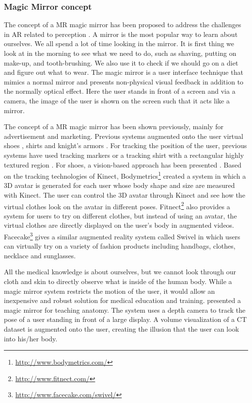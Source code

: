 \subsubsection{Magic Mirror concept}
The concept of a MR magic mirror has been proposed to address the challenges in AR related to perception \cite{Grosjean1999}.
A mirror is the most popular way to learn about ourselves. We all spend a lot of time looking in the mirror. It is first thing we look at in the morning to see what we need to do, such as shaving, putting on make-up, and tooth-brushing. We also use it to check if we should go on a diet and figure out what to wear. 
The magic mirror is a user interface technique that mimics a normal mirror and presents non-physical visual feedback in addition to the normally optical effect. Here the user stands in front of a screen and via a camera, the image of the user is shown on the screen such that it acts like a mirror.

The concept of a MR magic mirror has been shown previously, mainly for advertisement and marketing. 
Previous systems augmented onto the user virtual shoes \cite{Eisert2008,Luh2013}, shirts \cite{Ehara2006} and knight's armors \cite{Fiala2007}. For tracking the position of the user, previous systems have used tracking markers or a tracking shirt with a rectangular highly textured region \cite{Hilsmann2008}. For shoes, a vision-based approach has been presented \cite{Eisert2008}.
Based on the tracking technologies of Kinect, Bodymetrics\footnote{\url{http://www.bodymetrics.com/}} created a system in which a 3D avatar is generated for each user whose body shape and size are measured with Kinect. The user can control the 3D avatar through Kinect and see how the virtual clothes look on the avatar in different poses. Fitnect\footnote{\url{http://www.fitnect.com/}} also provides a system for users to try on different clothes, but instead of using an avatar, the virtual clothes are directly displayed on the user's body in augmented videos. Facecake\footnote{\url{http://www.facecake.com/swivel/}} gives a similar augmented reality system called Swivel in which users can virtually try on a variety of fashion products including handbags, clothes, necklace and sunglasses.

All the medical knowledge is about ourselves, but we cannot look through our cloth and skin to directly observe what is inside of the human body. 
While a magic mirror system restricts the motion of the user, it would allow an inexpensive and robust solution for medical education and training. \citet{Blum2012a} presented a magic mirror for teaching anatomy. The system uses a depth camera to track the pose of a user standing in front of a large display. A volume visualization of a CT dataset is augmented onto the user, creating the illusion that the user can look into his/her body.

